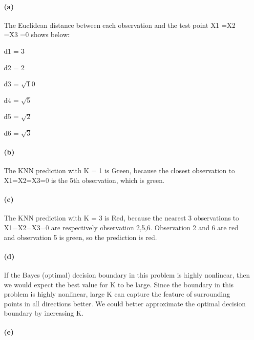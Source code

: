 \documentclass[11pt]{article}
\begin{document}
    \paragraph{(a)}\label{a}

    The Euclidean distance between each observation and the test point X1
=X2 =X3 =0 shows below:

d1 = 3

d2 = 2

d3 = \(\sqrt10\)

d4 = \(\sqrt5\)

d5 = \(\sqrt2\)

d6 = \(\sqrt3\)

    \paragraph{(b)}\label{b}

    The KNN prediction with K = 1 is Green, because the closest observation
to X1=X2=X3=0 is the 5th observation, which is green.

    \paragraph{(c)}\label{c}

    The KNN prediction with K = 3 is Red, because the nearest 3 observations
to X1=X2=X3=0 are respectively observation 2,5,6. Observation 2 and 6
are red and observation 5 is green, so the prediction is red.

    \paragraph{(d)}\label{d}

    If the Bayes (optimal) decision boundary in this problem is highly
nonlinear, then we would expect the best value for K to be large. Since
the boundary in this problem is highly nonlinear, large K can capture
the feature of surrounding points in all directions better. We could
better approximate the optimal decision boundary by increasing K.

    \paragraph{(e)}\label{e}
\end{document}
